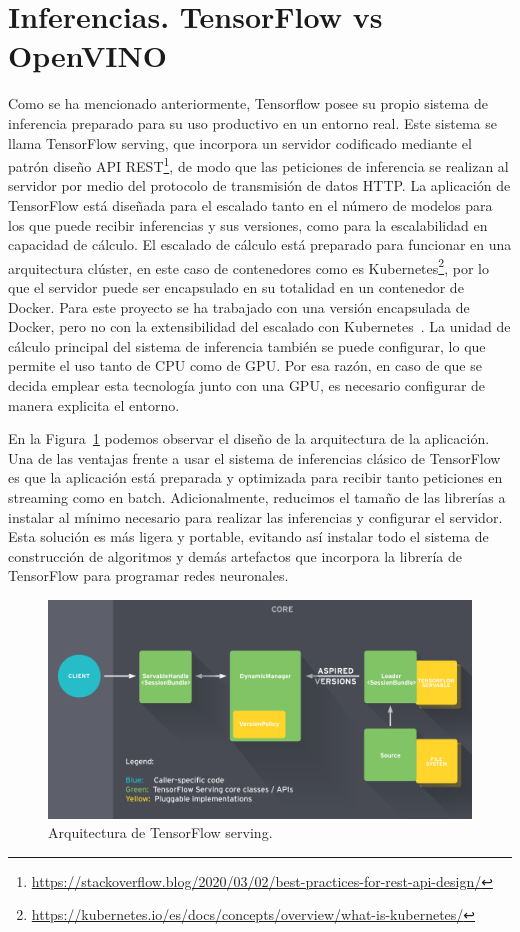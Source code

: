 \section{Inferencias. TensorFlow vs OpenVINO}\label{sec:inferencias.-Tensorflow-vs-OpenVINO}
Como se ha mencionado anteriormente, Tensorflow posee su propio sistema de inferencia preparado para su uso productivo en un entorno real. Este sistema se llama TensorFlow serving, que incorpora un servidor codificado mediante el patrón diseño API REST\footnote{\url{https://stackoverflow.blog/2020/03/02/best-practices-for-rest-api-design/}}, de modo que las peticiones de inferencia se realizan al servidor por medio del protocolo de transmisión de datos HTTP.
La aplicación de TensorFlow está diseñada para el escalado tanto en el número de modelos para los que puede recibir inferencias y sus versiones, como para la escalabilidad en capacidad de cálculo.
El escalado de cálculo está preparado para funcionar en una arquitectura clúster, en este caso de contenedores como es Kubernetes\footnote{\url{https://kubernetes.io/es/docs/concepts/overview/what-is-kubernetes/}}, por lo que el servidor puede ser encapsulado en su totalidad en un contenedor de Docker. Para este proyecto se ha trabajado con una versión encapsulada de Docker, pero no con la extensibilidad del escalado con Kubernetes~\cite{kubernetes}.
La unidad de cálculo principal del sistema de inferencia también se puede configurar, lo que permite el uso tanto de CPU como de GPU.
Por esa razón, en caso de que se decida emplear esta tecnología junto con una GPU, es necesario configurar de manera explicita el entorno.

En la Figura~\ref{fig:Arquitectura de TensorFlow serving} podemos observar el diseño de la arquitectura de la aplicación. Una de las ventajas frente a usar el sistema de inferencias clásico de TensorFlow es que la aplicación está preparada y optimizada para recibir tanto peticiones en streaming como en batch. Adicionalmente, reducimos el tamaño de las librerías a instalar al mínimo necesario para realizar las inferencias y configurar el servidor. Esta solución es más ligera y portable, evitando así instalar todo el sistema de construcción de algoritmos y demás artefactos que incorpora la librería de TensorFlow para programar redes neuronales.

\begin{figure}[h]
    \centering
    \includegraphics[width=1.0\textwidth]{images/chapter3/tf_serving_architecture.png}
    \caption{Arquitectura de TensorFlow serving.}
    \label{fig:Arquitectura de TensorFlow serving}
\end{figure}

